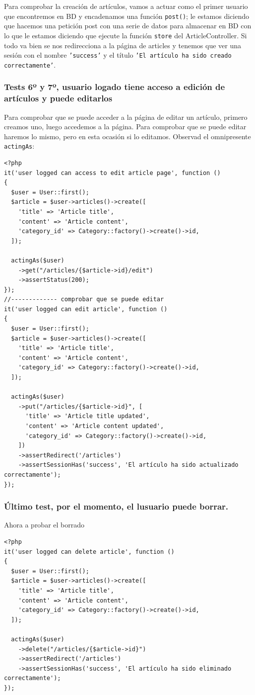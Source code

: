 \documentclass[11pt]{article}
\begin{document}
Para comprobar la creación de artículos, vamos a actuar como el primer
usuario que encontremos en BD y encadenamos una función \texttt{post()}; le
estamos diciendo que hacemos una petición post con una serie de datos
para almacenar en BD con lo que le estamos diciendo que ejecute la
función \texttt{store} del ArticleController. Si todo va bien se nos
redirecciona a la página de articles y tenemos que ver una sesión con
el nombre \texttt{'success'} y el título \texttt{'El artículo ha sido creado
correctamente'}.

\subsubsection{Tests 6º y 7º, usuario logado tiene acceso a edición de artículos y puede editarlos}
\label{sec:orga1afeaa}
Para comprobar que se puede acceder a la página de editar un artículo,
primero creamos uno, luego accedemos a la página. Para comprobar que
se puede editar haremos lo mismo, pero en esta ocasión si lo
editamos. Observad el omnipresente \texttt{actingAs}:
\begin{verbatim}
<?php
it('user logged can access to edit article page', function ()
{
  $user = User::first();
  $article = $user->articles()->create([
    'title' => 'Article title',
    'content' => 'Article content',
    'category_id' => Category::factory()->create()->id,
  ]);

  actingAs($user)
    ->get("/articles/{$article->id}/edit")
    ->assertStatus(200);
});
//------------- comprobar que se puede editar
it('user logged can edit article', function ()
{
  $user = User::first();
  $article = $user->articles()->create([
    'title' => 'Article title',
    'content' => 'Article content',
    'category_id' => Category::factory()->create()->id,
  ]);

  actingAs($user)
    ->put("/articles/{$article->id}", [
      'title' => 'Article title updated',
      'content' => 'Article content updated',
      'category_id' => Category::factory()->create()->id,
    ])
    ->assertRedirect('/articles')
    ->assertSessionHas('success', 'El artículo ha sido actualizado correctamente');
});
\end{verbatim}

\subsubsection{Último test, por el momento, el lusuario puede borrar.}
\label{sec:org7bee888}
Ahora a probar el borrado
\begin{verbatim}
<?php
it('user logged can delete article', function ()
{
  $user = User::first();
  $article = $user->articles()->create([
    'title' => 'Article title',
    'content' => 'Article content',
    'category_id' => Category::factory()->create()->id,
  ]);

  actingAs($user)
    ->delete("/articles/{$article->id}")
    ->assertRedirect('/articles')
    ->assertSessionHas('success', 'El artículo ha sido eliminado correctamente');
});

\end{verbatim}
\end{document}

